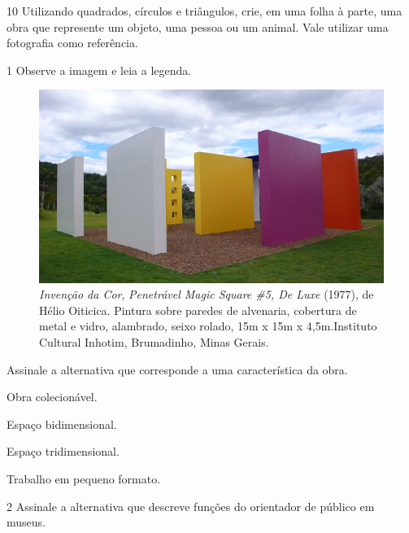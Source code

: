 \num{10} Utilizando quadrados, círculos e triângulos, crie, em uma folha à parte,
uma obra que represente um objeto, uma pessoa ou um animal. Vale utilizar uma fotografia como referência.



\num{1} Observe a imagem e leia a legenda.

\begin{figure}[htpb!]
\includegraphics[width=\textwidth]{./imgs/art9.png}
\caption{\emph{Invenção da Cor}, \emph{Penetrável Magic Square \#5, De Luxe} (1977), de Hélio Oiticica. Pintura sobre paredes de alvenaria, cobertura de metal e vidro, alambrado, seixo rolado, 15m x 15m x 4,5m.Instituto Cultural Inhotim, Brumadinho, Minas Gerais.}
\end{figure}

Assinale a alternativa que corresponde a uma característica da obra.

\begin{minipage}{.5\textwidth}
\begin{escolha}
\item
  Obra colecionável.
\item
  Espaço bidimensional.
\item
  Espaço tridimensional.
\item
  Trabalho em pequeno formato.
\end{escolha}
\end{minipage}

\num{2} Assinale a alternativa que descreve funções do orientador de público em museus.

